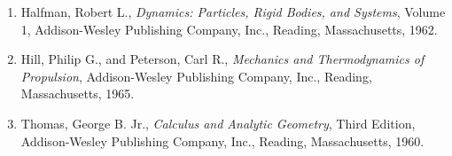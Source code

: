 \label{ch1:sec:refs}
\begin{enumerate}[label=\arabic*.,ref=\arabic*,leftmargin=*]
  \item\label{ch1:ref:1} Halfman, Robert L., \emph{Dynamics: Particles, Rigid Bodies, and Systems}, Volume 1, Addison-Wesley Publishing Company, Inc., Reading, Massachusetts, 1962.
  \item\label{ch1:ref:2} Hill, Philip G., and Peterson, Carl R., \emph{Mechanics and Thermodynamics of Propulsion}, Addison-Wesley Publishing Company, Inc., Reading, Massachusetts, 1965.
  \item\label{ch1:ref:3} Thomas, George B. Jr., \emph{Calculus and Analytic Geometry}, Third Edition, Addison-Wesley Publishing Company, Inc., Reading, Massachusetts, 1960.
\end{enumerate}
